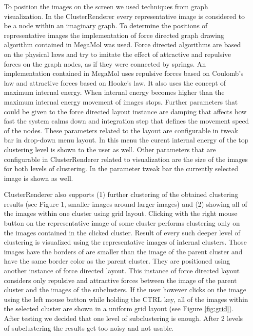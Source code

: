 \documentclass[journal]{vgtc}       %
\begin{document}
To position the images on the screen we used techniques from graph visualization. In the ClusterRenderer every representative image is considered to be a node within an imaginary graph. To determine the positions of representative images the implementation of force directed graph drawing algorithm contained in MegaMol was used. Force directed algorithms are based on the physical laws and try to imitate the effect of attractive and repulsive forces on the graph nodes, as if they were connected by springs. An implementation contained in MegaMol uses repulsive forces based on Coulomb's law and attractive forces based on Hooke’s law. It also uses the concept of maximum internal energy. When internal energy becomes higher than the maximum internal energy movement of images stops. Further parameters that could be given to the force directed layout instance are damping that affects how fast the system calms down and integration step that defines the movement speed of the nodes. 
These parameters related to the layout are configurable in tweak bar in drop-down menu layout. In this menu the curent internal energy of the top clustering level is shown to the user as well.
Other parameters that are configurable in ClusterRenderer related to visualization are the size of the images for both levels of clustering. In the parameter tweak bar the currently selected image is shown as well. 

ClusterRenderer also supports (1) further clustering of the obtained clustering results (see Figure 1, smaller images around larger images) and (2) showing all of the images within one cluster using grid layout. Clicking with the right mouse button on the representative image of some cluster performs clustering only on the images contained in the clicked cluster. Result of every such deeper level of clustering is visualized using the representative images of internal clusters. Those images have the borders of are smaller than the image of the parent cluster and have the same border color as the parent cluster. They are positioned using another instance of force directed layout. This instance of force directed layout considers only repulsive and attractive forces between the image of the parent cluster and the images of the subclusters. If the user however clicks on the image using the left mouse button while holding the CTRL key, all of the images within the selected cluster are shown in a uniform grid layout (see Figure \ref{fig:grid}). 
After testing we decided that one level of subclustering is enough. After 2 levels of subclustering the results get too  noisy and not usable.
\end{document}
